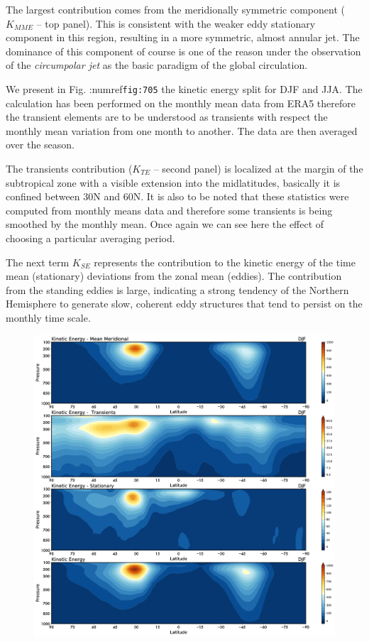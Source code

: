 The largest contribution comes from the meridionally symmetric component
(\(K_{MME}\) -- top panel). This is consistent with the weaker eddy
stationary component in this region, resulting in a more symmetric,
almost annular jet. The dominance of this component of course is one of
the reason under the observation of the \emph{circumpolar jet} as the
basic paradigm of the global circulation.

We present in Fig. :numref\texttt{fig:705} the kinetic energy split for
DJF and JJA. The calculation has been performed on the monthly mean data
from ERA5 therefore the transient elements are to be understood as
transients with respect the monthly mean variation from one month to
another. The data are then averaged over the season.

The transients contribution (\(K_{TE}\) -- second panel) is localized at
the margin of the subtropical zone with a visible extension into the
midlatitudes, basically it is confined between 30N and 60N. It is also
to be noted that these statistics were computed from monthly means data
and therefore some transients is being smoothed by the monthly mean.
Once again we can see here the effect of choosing a particular averaging
period.

The next term \(K_{SE}\) represents the contribution to the kinetic
energy of the time mean (stationary) deviations from the zonal mean
(eddies). The contribution from the standing eddies is large, indicating
a strong tendency of the Northern Hemisphere to generate slow, coherent
eddy structures that tend to persist on the monthly time scale.

\begin{figure}
\centering
\includegraphics[width = .7 \textwidth]{figs/GD/DJFKEFlux.png}
\caption{}\label{}
\end{figure}

